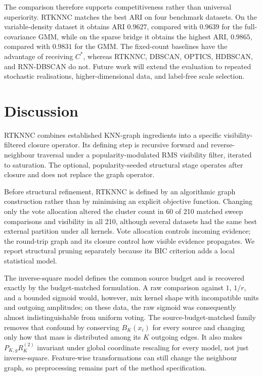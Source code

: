 \documentclass[review,12pt]{elsarticle}
\begin{document}
\begin{landscape}
\begingroup
\setlength{\textwidth}{\linewidth}

\endgroup
\end{landscape}

The comparison therefore supports competitiveness rather than universal
superiority. RTKNNC matches the best ARI on four benchmark datasets. On the
variable-density dataset it obtains ARI $0.9627$, compared with $0.9639$ for
the full-covariance GMM, while on the sparse bridge it obtains the highest ARI,
$0.9865$, compared with $0.9831$ for the GMM. The fixed-count baselines have
the advantage of receiving $C^*$, whereas RTKNNC, DBSCAN, OPTICS, HDBSCAN,
and RNN-DBSCAN do not. Future work will
extend the evaluation to repeated stochastic realisations, higher-dimensional
data, and label-free scale selection.

\section{Discussion}\label{sec:discussion}

RTKNNC combines established KNN-graph ingredients into a specific
visibility-filtered closure operator. Its defining step is recursive forward
and reverse-neighbour traversal under a popularity-modulated RMS visibility
filter, iterated to saturation. The optional,
popularity-seeded structural stage operates after closure and does not
replace the graph operator.

Before structural refinement, RTKNNC is defined by an algorithmic graph construction rather than by
minimising an explicit objective function. Changing only the vote allocation
altered the cluster count in 60 of 210 matched sweep comparisons and visibility in
all 210, although several datasets had the same best external partition under
all kernels. Vote allocation controls incoming evidence; the round-trip graph
and its closure control how visible evidence propagates. We report structural
pruning separately because its BIC criterion adds a local statistical model.

The inverse-square model defines the common source budget and is recovered
exactly by the budget-matched formulation.  A raw comparison against $1$,
$1/r$, and a bounded sigmoid would, however, mix kernel shape with incompatible
units and outgoing amplitudes; on these data, the raw sigmoid was consequently
almost indistinguishable from uniform voting.  The source-budget-matched family
removes that confound by conserving $B_K(x_i)$ for every source and changing
only how that mass is distributed among its $K$ outgoing edges.  It also makes
$P_{K,g}R_K^{(2)}$ invariant under global coordinate rescaling for every model,
not just inverse-square.  Feature-wise transformations can still change the
neighbour graph, so preprocessing remains part of the method specification.
\end{document}
